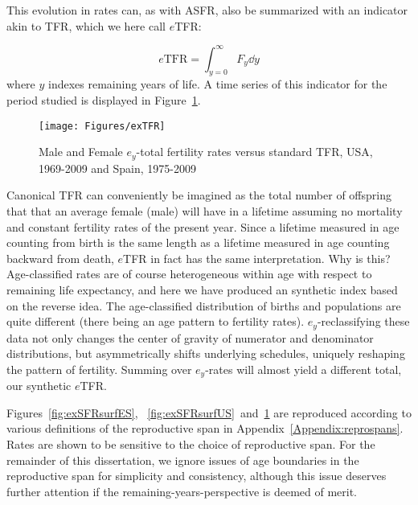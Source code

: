  \FloatBarrier
This evolution in rates can, as with ASFR, also be
summarized with an indicator akin to TFR, which we here call $e$TFR:

\begin{equation}
\label{eq:exTFR}
e\mathrm{TFR} = \int _{y=0}^\infty F_y \dd y
\end{equation}
where $y$ indexes remaining years of life. A time series of this indicator
for the period studied is displayed in Figure~\ref{fig:exTFR}.

\begin{figure}[ht!]
        \centering  
          \caption{Male and Female $e_y$-total fertility rates versus standard
          TFR, USA, 1969-2009 and Spain, 1975-2009}
           \texttt{[image: Figures/exTFR]}
          \label{fig:exTFR}
\end{figure}

Canonical TFR can conveniently be imagined as the total number of
offspring that that an average female (male) will have in a lifetime assuming
no mortality and constant fertility rates of the present year.
Since a lifetime measured in age counting from birth is the same length as a
lifetime measured in age counting backward from death, $e$TFR in fact has the
same interpretation. Why is this? Age-classified rates are of course
heterogeneous within age with respect to remaining life expectancy, and here we
have produced an synthetic index based on the reverse idea. The age-classified
distribution of births and populations are quite different (there being an age
pattern to fertility rates). $e_y$-reclassifying these data not only changes the
center of gravity of numerator and denominator distributions, but asymmetrically
shifts underlying schedules, uniquely reshaping the pattern of
fertility. Summing over $e_y$-rates will almost yield a different total, our
synthetic $e$TFR. 

Figures~\ref{fig:exSFRsurfES}, ~\ref{fig:exSFRsurfUS}~and~\ref{fig:exTFR} are
reproduced according to various definitions of the reproductive span in
Appendix~\ref{Appendix:reprospans}. Rates are shown to be sensitive to the
choice of reproductive span. For the remainder of this dissertation, we ignore
issues of age boundaries in the reproductive span for simplicity and
consistency, although this issue deserves further attention if the
remaining-years-perspective is deemed of merit.